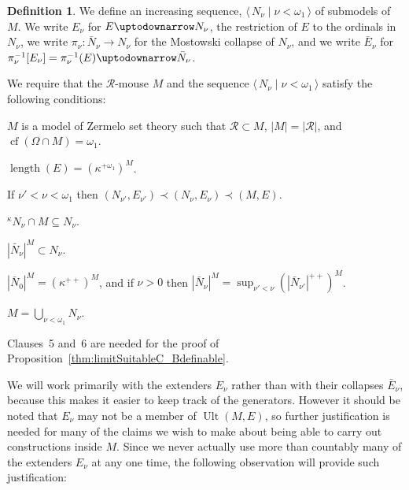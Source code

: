 \documentclass[
twoside,
]{article}
\theoremstyle{definition}
\newtheorem{definition}[theorem]{Definition}
\theoremstyle{remark}
\newcommand{\ords}{\Omega}
\newcommand\reals{\mathcal{R}}
\newcommand{\ecut}{{\uptodownarrow}} %
\newcommand{\cut}{{\vert}}
\DeclareMathOperator{\len}{length}
\newcommand{\pair}[1]{\langle#1\rangle}
\newcommand{\seq}[1]{\pair{\,#1\,}}
\newcommand{\card}[1]{|#1|}
\DeclareMathOperator{\ult}{Ult}
\DeclareMathOperator{\cof}{cf}
\begin{document}
\begin{definition}\label{def:Nsequence}
  We  define an increasing sequence, $\seq{N_\nu\mid \nu<\omega_1}$
  of submodels of $M$.
  We write $E_{\nu}$ for $E\ecut N_{\nu}$,
  the restriction of $E$ to the ordinals in $N_{\nu}$,  
  we write $\pi_{\nu}\colon \bar N_\nu\to N_\nu$ for the Mostowski
  collapse of $N_\nu$, and we write $\bar E_\nu$ for
  $\pi_{\nu}^{-1}[E_\nu]=\pi_{\nu}^{-1}(E)\ecut\bar N_\nu$.

  We require that the $\reals$-mouse $M$ and the sequence
  $\seq{N_\nu\mid \nu<\omega_1}$   satisfy the following conditions: 
  \begin{compactenum}
  \item $M$ is a model of Zermelo set theory such that
    $\reals\subset M$, 
    $\card{M}=\card{\reals}$, and 
    $\cof(\ords\cap M)=\omega_1$. 
  \item  $\len(E)=(\kappa^{+\omega_1})^{M}$. 
  \item If $\nu'<\nu<\omega_1$ then $(N_{\nu'},E_{\nu'})\prec (N_{\nu},E_{\nu})\prec
    (M,E)$. 
  \item $^{\kappa}N_{\nu}\cap{ M}\subseteq N_{\nu}$.

  \item\label{item:cardNnuSubsetNnu}
    $\card {\bar N_\nu}^{M}\subset N_\nu$.
  \item\label{item:Nseq-doublepluss} $\card {\bar
      N_0}^{M}=(\kappa^{++})^{M}$, and if $\nu>0$ then
    $\card {\bar N_\nu}^{M}=\sup_{\nu'<\nu}(\card{\bar N_{\nu'}}^{++})^{M}$.
  \item \label{item:Eseq-MIsUnionN}
    $M=\bigcup_{\nu<\omega_1}N_{\nu}$.
  \end{compactenum}
\end{definition}

Clauses~5 and~6 are needed for the proof of
Proposition~\ref{thm:limitSuitableC_Bdefinable}. 

We will work primarily with the extenders $E_{\nu}$ rather than with their
collapses $\bar E_{\nu}$, because this makes  it easier to keep track
of the generators.   However it should be noted that  $E_{\nu}$ may
not be a member of $\ult(M,E)$, 
so further justification is needed for  many of the claims we
wish to make about being able to 
carry out constructions inside $M$.     Since we never actually use
more than countably many of the extenders $E_{\nu}$ at any one time,
the following observation will provide such justification:
\end{document}
